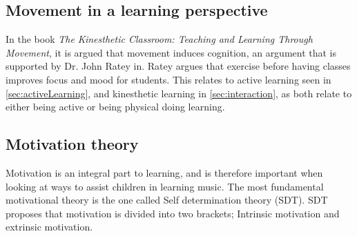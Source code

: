 \subsection{Movement in a learning perspective}
	In the book \textit{The Kinesthetic Classroom: Teaching and Learning Through Movement}\cite{kinestheticMovement}, it is argued that movement induces cognition, an argument that is supported by Dr. John Ratey in\cite{rateySpark}. Ratey argues that exercise before having classes improves focus and mood for students\cite[p.~33]{rateySpark}. This relates to active learning seen in \autoref{sec:activeLearning}, and kinesthetic learning in \autoref{sec:interaction}, as both relate to either being active or being physical doing learning.
\subsection{Motivation theory}
Motivation is an integral part to learning\cite{motivationGameDesign}, and is therefore important when looking at ways to assist children in learning music. The most fundamental motivational theory is the one called Self determination theory (SDT)\cite{SDT}. SDT proposes that motivation is divided into two brackets; Intrinsic motivation and extrinsic motivation\cite{SDT}. 

